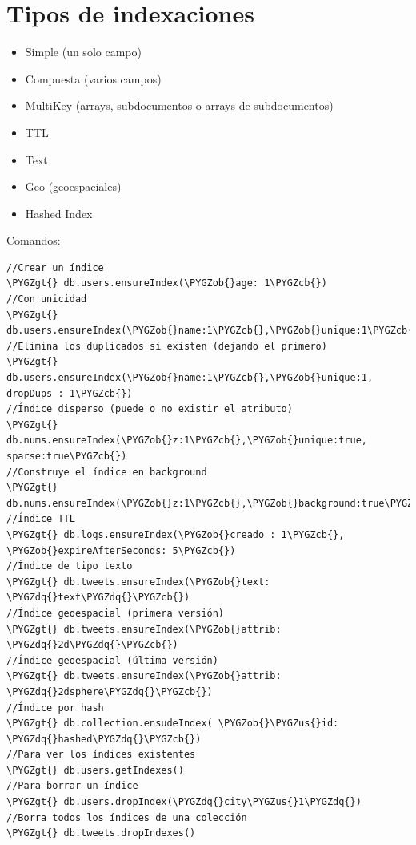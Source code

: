 \documentclass[a4paper,10pt,english]{sphinxmanual}
\def\PYGZus{\char`\_}
\def\PYGZob{\char`\{}
\def\PYGZcb{\char`\}}
\def\PYGZgt{\char`\>}
\def\PYGZdq{\char`\"}
\begin{document}
\section{Tipos de indexaciones}
\label{contents/optimizing:tipos-de-indexaciones}\begin{itemize}
\item {} 
Simple (un solo campo)

\item {} 
Compuesta (varios campos)

\item {} 
MultiKey (arrays, subdocumentos o arrays de subdocumentos)

\item {} 
TTL

\item {} 
Text

\item {} 
Geo (geoespaciales)

\item {} 
Hashed Index

\end{itemize}

Comandos:

\begin{Verbatim}[commandchars=\\\{\}]
//Crear un índice
\PYGZgt{} db.users.ensureIndex(\PYGZob{}age: 1\PYGZcb{})
//Con unicidad
\PYGZgt{} db.users.ensureIndex(\PYGZob{}name:1\PYGZcb{},\PYGZob{}unique:1\PYGZcb{})
//Elimina los duplicados si existen (dejando el primero)
\PYGZgt{} db.users.ensureIndex(\PYGZob{}name:1\PYGZcb{},\PYGZob{}unique:1, dropDups : 1\PYGZcb{})
//Índice disperso (puede o no existir el atributo)
\PYGZgt{} db.nums.ensureIndex(\PYGZob{}z:1\PYGZcb{},\PYGZob{}unique:true, sparse:true\PYGZcb{})
//Construye el índice en background
\PYGZgt{} db.nums.ensureIndex(\PYGZob{}z:1\PYGZcb{},\PYGZob{}background:true\PYGZcb{})
//Índice TTL
\PYGZgt{} db.logs.ensureIndex(\PYGZob{}creado : 1\PYGZcb{}, \PYGZob{}expireAfterSeconds: 5\PYGZcb{})
//Índice de tipo texto
\PYGZgt{} db.tweets.ensureIndex(\PYGZob{}text: \PYGZdq{}text\PYGZdq{}\PYGZcb{})
//Índice geoespacial (primera versión)
\PYGZgt{} db.tweets.ensureIndex(\PYGZob{}attrib: \PYGZdq{}2d\PYGZdq{}\PYGZcb{})
//Índice geoespacial (última versión)
\PYGZgt{} db.tweets.ensureIndex(\PYGZob{}attrib: \PYGZdq{}2dsphere\PYGZdq{}\PYGZcb{})
//Índice por hash
\PYGZgt{} db.collection.ensudeIndex( \PYGZob{}\PYGZus{}id: \PYGZdq{}hashed\PYGZdq{}\PYGZcb{})
//Para ver los índices existentes
\PYGZgt{} db.users.getIndexes()
//Para borrar un índice
\PYGZgt{} db.users.dropIndex(\PYGZdq{}city\PYGZus{}1\PYGZdq{})
//Borra todos los índices de una colección
\PYGZgt{} db.tweets.dropIndexes()
\end{Verbatim}
\end{document}
